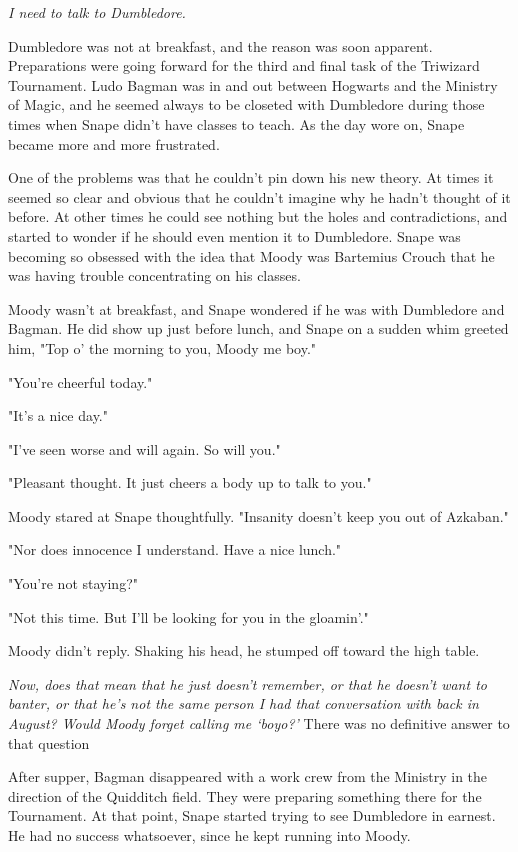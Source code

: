 \documentclass[a4paper,11pt]{article}
\begin{document}
\emph{I need to talk to Dumbledore.}

Dumbledore was not at breakfast, and the reason was soon apparent. Preparations were going forward for the third and final task of the Triwizard Tournament. Ludo Bagman was in and out between Hogwarts and the Ministry of Magic, and he seemed always to be closeted with Dumbledore during those times when Snape didn't have classes to teach. As the day wore on, Snape became more and more frustrated.

One of the problems was that he couldn't pin down his new theory. At times it seemed so clear and obvious that he couldn't imagine why he hadn't thought of it before. At other times he could see nothing but the holes and contradictions, and started to wonder if he should even mention it to Dumbledore. Snape was becoming so obsessed with the idea that Moody was Bartemius Crouch that he was having trouble concentrating on his classes.

Moody wasn't at breakfast, and Snape wondered if he was with Dumbledore and Bagman. He did show up just before lunch, and Snape on a sudden whim greeted him, "Top o' the morning to you, Moody me boy."

"You're cheerful today."

"It's a nice day."

"I've seen worse and will again. So will you."

"Pleasant thought. It just cheers a body up to talk to you."

Moody stared at Snape thoughtfully. "Insanity doesn't keep you out of Azkaban."

"Nor does innocence I understand. Have a nice lunch."

"You're not staying?"

"Not this time. But I'll be looking for you in the gloamin'."

Moody didn't reply. Shaking his head, he stumped off toward the high table.

\emph{Now, does that mean that he just doesn't remember, or that he doesn't want to banter, or that he's not the same person I had that conversation with back in August? Would Moody forget calling me `boyo?'} There was no definitive answer to that question

After supper, Bagman disappeared with a work crew from the Ministry in the direction of the Quidditch field. They were preparing something there for the Tournament. At that point, Snape started trying to see Dumbledore in earnest. He had no success whatsoever, since he kept running into Moody.
\end{document}

